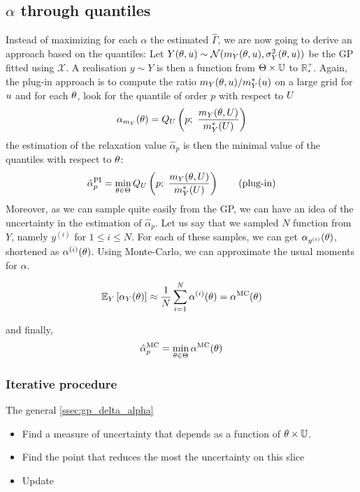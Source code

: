 \documentclass[../../Main_ManuscritThese.tex]{subfiles}
\begin{document}
\subsection{$\alpha$ through quantiles}
Instead of maximizing for each $\alpha$ the estimated $\hat{\Gamma}$, we are now going to derive an approach based on the quantiles:
Let $Y(\theta, u) \sim \mathcal{N}(m_Y(\theta,u), \sigma^2_{Y}(\theta, u))$ be the GP fitted using $\mathcal{X}$. A realisation $y\sim Y$ is then a function from $\Theta \times \mathbb{U}$ to $\mathbb{R}^{+}_*$.
Again, the plug-in approach is to compute the ratio $m_Y(\theta, u) / m^*_Y(u)$ on a large grid for $u$ and for each $\theta$, look for the quantile of order $p$ with respect to $U$
\begin{equation}
  \alpha_{m_{Y}}(\theta) = Q_{U}\left(p;~\frac{m_Y(\theta, U)}{m^*_Y(U)}\right)
\end{equation}
the estimation of the relaxation value $\hat{\alpha}_p$ is then the minimal value of the quantiles with respect to $\theta$:
\begin{equation}
    \label{eq:def_plugin_alpha}
  \hat{\alpha}^{\mathrm{PI}}_p = \min_{\theta \in \Theta} Q_U\left(p;~\frac{m_Y(\theta, U)}{m^*_Y(U)}\right)  \tag{plug-in}
\end{equation}
Moreover, as we can sample quite easily from the GP, we can have an idea of the uncertainty in the estimation of $\hat{\alpha}_p$.
Let us say that we sampled $N$ function from $Y$, namely $y^{(i)}$ for $1 \leq i \leq N$. For each of these samples, we can get $\alpha_{y^{(i)}}(\theta)$, shortened as $\alpha^{(i)}(\theta)$. Using Monte-Carlo, we can approximate the usual moments for $\alpha$.

\begin{equation}
 \mathbb{E}_{Y}\left[\alpha_{Y}(\theta) \right] \approx \frac{1}{N} \sum_{i=1}^N \alpha^{(i)}(\theta) = \alpha^{\mathrm{MC}}(\theta)
\end{equation}

and finally,
\begin{equation}
  \hat{\alpha}_p^{\mathrm{MC}} = \min_{\theta \in \Theta} \alpha^{\mathrm{MC}}(\theta)
\end{equation}


\subsubsection{Iterative procedure}
The general
\cref{ssec:gp_delta_alpha}
\begin{itemize}
\item Find a measure of uncertainty that depends as a function of $\theta \times \mathbb{U}$.
\item Find the point that reduces the most the uncertainty on this slice
\item Update
\end{itemize}
\end{document}
